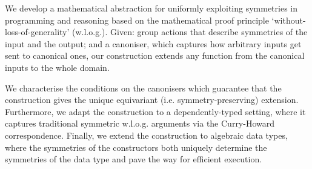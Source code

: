 We develop a mathematical abstraction for uniformly exploiting
symmetries in programming and reasoning based on the mathematical
proof principle `without-loss-of-generality' (w.l.o.g.). Given: group
actions that describe symmetries of the input and the output; and a
canoniser, which captures how arbitrary inputs get sent to canonical
ones, our construction extends any function from the canonical inputs
to the whole domain.

We characterise the conditions on the canonisers which guarantee that
the construction gives the unique equivariant (i.e.
symmetry-preserving) extension. Furthermore, we adapt the construction
to a dependently-typed setting, where it captures traditional
symmetric w.l.o.g. arguments via the Curry-Howard correspondence.
Finally, we extend the construction to algebraic data types, where the
symmetries of the constructors both uniquely determine the symmetries
of the data type and pave the way for efficient execution.
